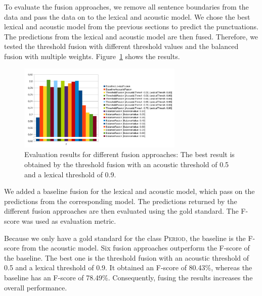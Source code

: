 To evaluate the fusion approaches, we remove all sentence boundaries from the data and pass the data on to the lexical and acoustic model.
We chose the best lexical and acoustic model from the previous sections to predict the punctuations.
The predictions from the lexical and acoustic model are then fused.
Therefore, we tested the threshold fusion with different threshold values and the balanced fusion with multiple weights.
Figure~\ref{fig:eval_fusion} shows the results.
\begin{figure}[ht]
    \centering
    \includegraphics[width=0.7\textwidth]{img/fusion_eval.pdf}
    \caption{Evaluation results for different fusion approaches: The best result is obtained by the threshold fusion with an acoustic threshold of 0.5 and a lexical threshold of 0.9.}
    \label{fig:eval_fusion}
\end{figure}
We added a baseline fusion for the lexical and acoustic model, which pass on the predictions from the corresponding model.
The predictions returned by the different fusion approaches are then evaluated using the gold standard.
The F-score was used as evaluation metric.

Because we only have a gold standard for the class \textsc{Period}, the baseline is the F-score from the acoustic model.
Six fusion approaches outperform the F-score of the baseline.
The best one is the threshold fusion with an acoustic threshold of 0.5 and a lexical threshold of 0.9.
It obtained an F-score of 80.43\%, whereas the baseline has an F-score of 78.49\%.
Consequently, fusing the results increases the overall performance.
